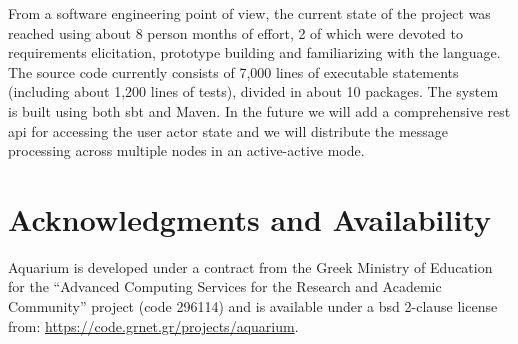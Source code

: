 \documentclass[letterpaper,twocolumn,10pt]{article}
\begin{document}
From a software engineering point of view, the current state of the
project was reached using about 8 person months of effort, 2 of which
were devoted to requirements elicitation, prototype building and
familiarizing with the language. The source code currently consists of
7,000 lines of executable statements (including about 1,200 lines of
tests), divided in about 10 packages. The system is built using both
{\sc sbt} and Maven. In the future we will add a comprehensive {\sc
  rest api} for accessing the user actor state and we will distribute
the message processing across multiple nodes in an active-active mode.

\section{Acknowledgments and Availability}

Aquarium is developed under a contract from the Greek Ministry of
Education for the ``Advanced Computing Services for the Research and
Academic Community'' project (code 296114) and is available under a {\sc bsd}
2-clause license from: \url{https://code.grnet.gr/projects/aquarium}.

{\footnotesize 
}
\end{document}
